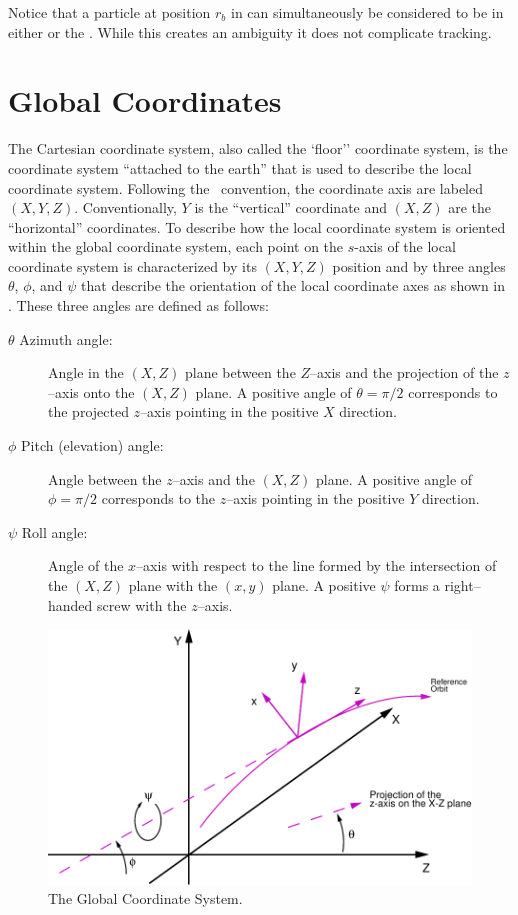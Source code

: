 Notice that a particle at position $r_b$ in  can
simultaneously be considered to be in either  or the
. While this creates an ambiguity it does not complicate
tracking.

\section{Global Coordinates}
\label{s:global}

The Cartesian  coordinate system, also called the `floor''
coordinate system, is the coordinate system ``attached to the earth''
that is used to describe the local coordinate system. Following the
\mad\ convention, the  coordinate axis are labeled $(X, Y,
Z)$. Conventionally, $Y$ is the ``vertical'' coordinate and $(X, Z)$
are the ``horizontal'' coordinates. To describe how the local
coordinate system is oriented within the global coordinate system,
each point on the $s$-axis of the local coordinate system is
characterized by its $(X, Y, Z)$ position and by three angles $\theta$,
$\phi$, and $\psi$ that describe the orientation of the local coordinate axes
as shown in . These three angles are defined as
follows:
\begin{description}
\item[$\theta$ Azimuth angle:] Angle in the $(X, Z)$ plane 
between the $Z$--axis and the projection of the $z$--axis onto the
$(X, Z)$ plane. A positive angle of $\theta = \pi/2$ corresponds to the
projected $z$--axis pointing in the positive $X$ direction.
\item[$\phi$ Pitch (elevation) angle:] Angle between the $z$--axis 
and the $(X,Z)$ plane. A positive angle of $\phi = \pi/2$ corresponds to
the $z$--axis pointing in the positive $Y$ direction.
\item[$\psi$ Roll angle:] Angle of the $x$--axis with respect 
to the line formed by the
intersection of the $(X, Z)$ plane with the $(x, y)$ plane. A
positive $\psi$ forms a right--handed screw with the $z$--axis.
\end{description}

\begin{figure}[tb]
\centering
\includegraphics{global-coords.pdf}
\caption[The Global Coordinate System]{The Global Coordinate System.}
\label{f:global.coords}
\end{figure}

